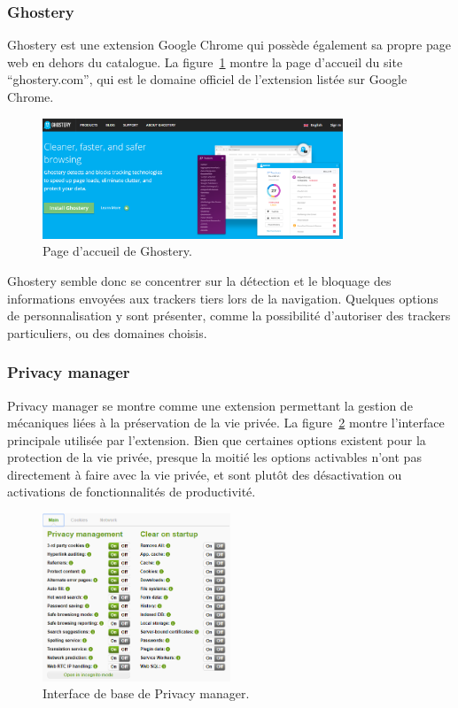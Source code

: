 			\subsubsection{Ghostery}

				Ghostery est une extension Google Chrome qui possède également sa propre page web en dehors du catalogue. La figure~\ref{a-ghostery} montre la page d'accueil du site ``ghostery.com'', qui est le domaine officiel de l'extension listée sur Google Chrome.

				\begin{figure}[ht]
					\centering
					\includegraphics[width=0.8\textwidth]{images/analysis/ghostery}
					\caption{Page d'accueil de Ghostery\cite{ghostery}.}
					\label{a-ghostery}
				\end{figure}

				Ghostery semble donc se concentrer sur la détection et le bloquage des informations envoyées aux trackers tiers lors de la navigation. Quelques options de personnalisation y sont présenter, comme la possibilité d'autoriser des trackers particuliers, ou des domaines choisis.

			\subsubsection{Privacy manager}

				Privacy manager se montre comme une extension permettant la gestion de mécaniques liées à la préservation de la vie privée. La figure~\ref{a-privacymanager} montre l'interface principale utilisée par l'extension. Bien que certaines options existent pour la protection de la vie privée, presque la moitié les options activables n'ont pas directement à faire avec la vie privée, et sont plutôt des désactivation ou activations de fonctionnalités de productivité.

				\begin{figure}[ht]
					\centering
					\includegraphics[width=0.5\textwidth]{images/analysis/privacy-manager}
					\caption{Interface de base de Privacy manager\cite{privacymanager}.}
					\label{a-privacymanager}
				\end{figure}

